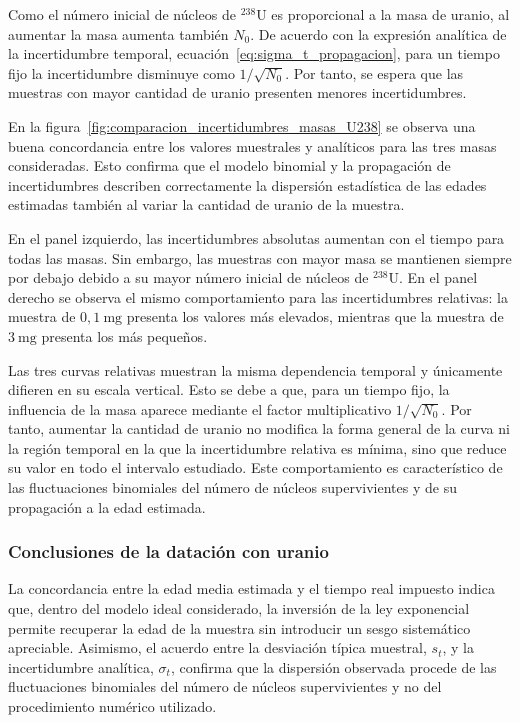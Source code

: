 \documentclass[12pt,a4paper]{article}
\begin{document}
Como el número inicial de núcleos de $^{238}\text{U}$ es proporcional a la masa de uranio, al aumentar la masa aumenta también $N_0$. De acuerdo con la expresión analítica de la incertidumbre temporal, ecuación~\eqref{eq:sigma_t_propagacion}, para un tiempo fijo la incertidumbre disminuye como $1/\sqrt{N_0}$. Por tanto, se espera que las muestras con mayor cantidad de uranio presenten menores incertidumbres.

En la figura~\ref{fig:comparacion_incertidumbres_masas_U238} se observa una buena concordancia entre los valores muestrales y analíticos para las tres masas consideradas. Esto confirma que el modelo binomial y la propagación de incertidumbres describen correctamente la dispersión estadística de las edades estimadas también al variar la cantidad de uranio de la muestra.

En el panel izquierdo, las incertidumbres absolutas aumentan con el tiempo para todas las masas. Sin embargo, las muestras con mayor masa se mantienen siempre por debajo debido a su mayor número inicial de núcleos de $^{238}\text{U}$. En el panel derecho se observa el mismo comportamiento para las incertidumbres relativas: la muestra de $0{,}1\ \text{mg}$ presenta los valores más elevados, mientras que la muestra de $3\ \text{mg}$ presenta los más pequeños.

Las tres curvas relativas muestran la misma dependencia temporal y únicamente difieren en su escala vertical. Esto se debe a que, para un tiempo fijo, la influencia de la masa aparece mediante el factor multiplicativo $1/\sqrt{N_0}$. Por tanto, aumentar la cantidad de uranio no modifica la forma general de la curva ni la región temporal en la que la incertidumbre relativa es mínima, sino que reduce su valor en todo el intervalo estudiado. Este comportamiento es característico de las fluctuaciones binomiales del número de núcleos supervivientes y de su propagación a la edad estimada.

\subsubsection{Conclusiones de la datación con uranio}

La concordancia entre la edad media estimada y el tiempo real impuesto indica que, dentro del modelo ideal considerado, la inversión de la ley exponencial permite recuperar la edad de la muestra sin introducir un sesgo sistemático apreciable. Asimismo, el acuerdo entre la desviación típica muestral, $s_t$, y la incertidumbre analítica, $\sigma_t$, confirma que la dispersión observada procede de las fluctuaciones binomiales del número de núcleos supervivientes y no del procedimiento numérico utilizado.
\end{document}
